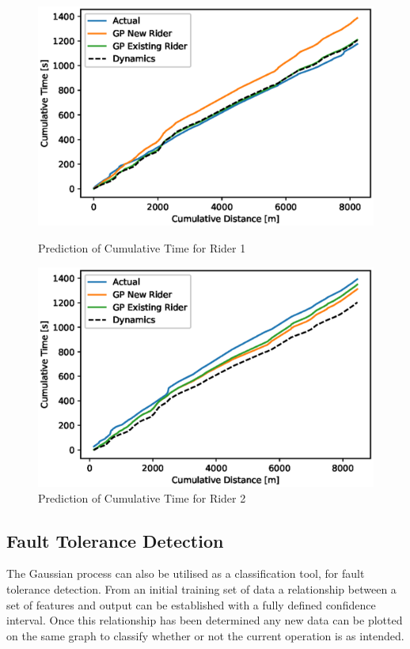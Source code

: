 \documentclass[a4paper, 10pt]{article}
\numberwithin{equation}{section}
\begin{document}
\begin{figure}[h!]
\centering
\begin{minipage}{.5\textwidth}
  \centering
        \includegraphics[width=\textwidth]{images/GP_TestRide/Combined/CM_Cumulative_Time.eps}
        
        \caption{Prediction of Cumulative Time for Rider 1}
        \label{fig:cm_fleet_cum_time}
\end{minipage}%
\begin{minipage}{.5\textwidth}
  \centering
        \includegraphics[width=\textwidth]{images/GP_TestRide/Combined/RR_Cumulative_Time.eps}
        \caption{Prediction of Cumulative Time for Rider 2}
        \label{fig:rr_fleet_cum_time}
\end{minipage}
\end{figure}


\newpage
\subsection{Fault Tolerance Detection}
\label{sec:fault_tolerance}
The Gaussian process can also be utilised as a classification tool, for fault tolerance detection. From an initial training set of data a relationship between a set of features and output can be established with a fully defined confidence interval. Once this relationship has been determined any new data can be plotted on the same graph to classify whether or not the current operation is as intended.
\end{document}
